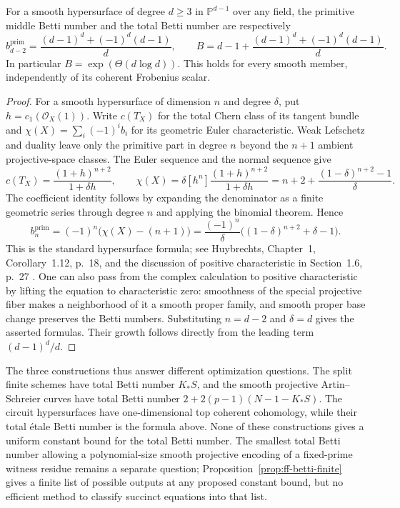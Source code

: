 \begin{proposition}\label{prop:ff-hypersurface-betti}
For a smooth hypersurface of degree $d\geq3$ in $\mathbb P^{d-1}$ over any field, the primitive middle Betti number and the total Betti number are respectively
\[
 b_{d-2}^{\mathrm{prim}}
   =\frac{(d-1)^d+(-1)^d(d-1)}d,
 \qquad
 B=d-1+\frac{(d-1)^d+(-1)^d(d-1)}d.
\]
In particular $B=\exp(\Theta(d\log d))$. This holds for every smooth member, independently of its coherent Frobenius scalar.
\end{proposition}
\begin{proof}
For a smooth hypersurface of dimension $n$ and degree $\delta$, put $h=c_1(\mathcal O_X(1))$. Write $c(T_X)$ for the total Chern class of its tangent bundle and $\chi(X)=\sum_i(-1)^i b_i$ for its geometric Euler characteristic. Weak Lefschetz and duality leave only the primitive part in degree $n$ beyond the $n+1$ ambient projective-space classes. The Euler sequence and the normal sequence give
\[
 c(T_X)=\frac{(1+h)^{n+2}}{1+\delta h},
 \qquad
 \chi(X)=\delta[h^n]\frac{(1+h)^{n+2}}{1+\delta h}
       =n+2+\frac{(1-\delta)^{n+2}-1}{\delta}.
\]
The coefficient identity follows by expanding the denominator as a finite geometric series through degree $n$ and applying the binomial theorem. Hence
\[
 b_n^{\mathrm{prim}}
   =(-1)^n\bigl(\chi(X)-(n+1)\bigr)
   =\frac{(-1)^n}{\delta}
       \bigl((1-\delta)^{n+2}+\delta-1\bigr).
\]
This is the standard hypersurface formula; see Huybrechts, Chapter~1, Corollary~1.12, p.~18, and the discussion of positive characteristic in Section~1.6, p.~27 \cite{ff-huybrechts}. One can also pass from the complex calculation to positive characteristic by lifting the equation to characteristic zero: smoothness of the special projective fiber makes a neighborhood of it a smooth proper family, and smooth proper base change preserves the Betti numbers. Substituting $n=d-2$ and $\delta=d$ gives the asserted formulas. Their growth follows directly from the leading term $(d-1)^d/d$.
\end{proof}

The three constructions thus answer different optimization questions. The split finite schemes have total Betti number $K_*S$, and the smooth projective Artin--Schreier curves have total Betti number $2+2(p-1)(N-1-K_*S)$. The circuit hypersurfaces have one-dimensional top coherent cohomology, while their total \'etale Betti number is the formula above. None of these constructions gives a uniform constant bound for the total Betti number. The smallest total Betti number allowing a polynomial-size smooth projective encoding of a fixed-prime witness residue remains a separate question; Proposition~\ref{prop:ff-betti-finite} gives a finite list of possible outputs at any proposed constant bound, but no efficient method to classify succinct equations into that list.

